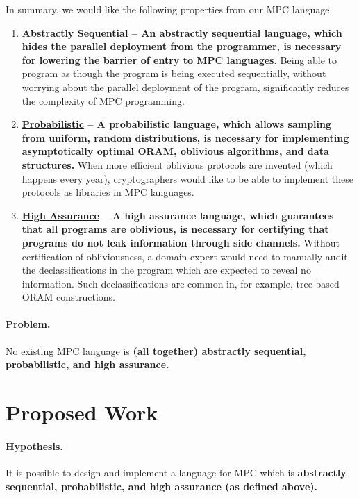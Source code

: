 In summary, we would like the following properties from our MPC language.

\begin{enumerate}
\item \label{itm:sequential} \textbf{\underline{Abstractly Sequential} -- An abstractly sequential language, which hides the parallel deployment from the
  programmer, is necessary for lowering the barrier of entry to MPC languages.}
  Being able to program as though the program is being executed sequentially, without worrying about the parallel deployment
  of the program, significantly reduces the complexity of MPC programming.
\item \label{itm:probabilistic} \textbf{\underline{Probabilistic} -- A probabilistic language, which allows sampling from uniform, random distributions, is necessary
  for implementing asymptotically optimal ORAM, oblivious algorithms, and data structures.}
  When more efficient oblivious protocols are invented (which happens every year), cryptographers would like to be able to
  implement these protocols as libraries in MPC languages.
\item \label{itm:assurance} \textbf{\underline{High Assurance} -- A high assurance language, which guarantees that all programs are oblivious, is necessary
  for certifying that programs do not leak information through side channels.} Without certification of obliviousness, a domain expert
  would need to manually audit the declassifications in the program which are expected to reveal no information. Such declassifications
  are common in, for example, tree-based ORAM constructions.
\end{enumerate}

\paragraph{Problem.} No existing MPC language is \textbf{(all together) abstractly sequential, probabilistic, and high assurance.}

\section{Proposed Work}
\label{sec:intro-proposal}

\paragraph{Hypothesis.} It is possible to design and implement a language for MPC which is \textbf{abstractly sequential, probabilistic,
  and high assurance (as defined above).}

